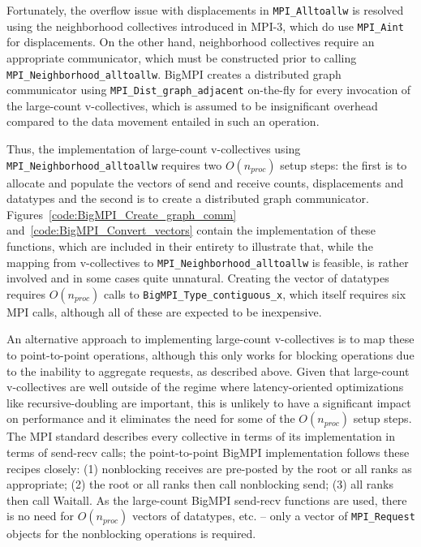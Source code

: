 Fortunately, the overflow issue with displacements in \texttt{MPI\_Alltoallw} is
resolved using the neighborhood collectives introduced in MPI-3, which do
use \texttt{MPI\_Aint} for displacements.
On the other hand, neighborhood collectives require an appropriate
communicator, which must be constructed prior to calling \texttt{MPI\_Neighborhood\_alltoallw}.
BigMPI creates a distributed graph communicator using \texttt{MPI\_Dist\_graph\_adjacent}
on-the-fly for every invocation of the large-count v-collectives, which is assumed to be
insignificant overhead compared to the data movement entailed in such an operation.

Thus, the implementation of large-count v-collectives using \texttt{MPI\_Neighborhood\_alltoallw} 
requires two $O(n_{proc})$ setup steps: the first is to allocate and populate the vectors of 
send and receive counts, displacements and datatypes and 
the second is to create a distributed graph communicator.
Figures~\ref{code:BigMPI_Create_graph_comm} and~\ref{code:BigMPI_Convert_vectors}
contain the implementation of these functions, which are included in their entirety to illustrate that,
while the mapping from v-collectives to \texttt{MPI\_Neighborhood\_alltoallw} is feasible,
is rather involved and in some cases quite unnatural.
Creating the vector of datatypes requires $O(n_{proc})$ calls to \texttt{BigMPI\_Type\_contiguous\_x},
which itself requires six MPI calls, although all of these are expected to be inexpensive.


An alternative approach to implementing large-count v-collectives is to map
these to point-to-point operations, although this only works for blocking operations
due to the inability to aggregate requests, as described above.
Given that large-count v-collectives are well outside of the regime where latency-oriented 
optimizations like recursive-doubling are important, this is unlikely to have a significant impact 
on performance and it eliminates the need for some of the $O(n_{proc})$ setup steps.
The MPI standard describes every collective in terms of its implementation 
in terms of send-recv calls; the point-to-point BigMPI implementation 
follows these recipes closely:
(1) nonblocking receives are pre-posted by the root or all ranks as appropriate;
(2) the root or all ranks then call nonblocking send; 
(3) all ranks then call Waitall.
As the large-count BigMPI send-recv functions are used, there is no need for
$O(n_{proc})$ vectors of datatypes, etc. -- only a vector of \texttt{MPI\_Request}
objects for the nonblocking operations is required.

